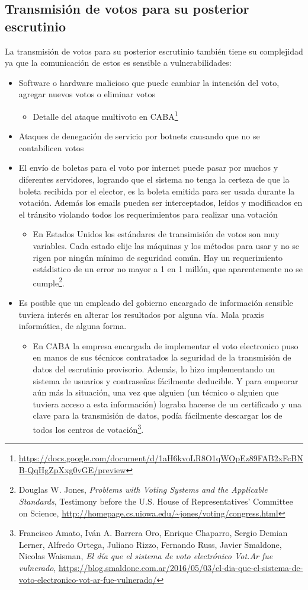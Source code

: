 \documentclass[a4,11pt]{article}
\begin{document}
\subsection{Transmisión de votos para su posterior escrutinio}

La transmisión de votos para su posterior escrutinio también tiene su complejidad ya que la comunicación de estos es sensible a vulnerabilidades:
\begin{itemize}
\item Software o hardware malicioso que puede cambiar la intención del voto, agregar nuevos votos o eliminar votos
\begin{itemize}
\item Detalle del ataque multivoto en CABA\footnote{\url{https://docs.google.com/document/d/1aH6kvoLR8O1qWOpEz89FAB2xFcBNB-QqHgZpXxg0vGE/preview}}
\end{itemize}
\item Ataques de denegación de servicio por botnets causando que no se contabilicen votos
\item El envío de boletas para el voto por internet puede pasar por muchos y diferentes servidores, logrando que el sistema no tenga la certeza de que la boleta recibida por el elector, es la boleta emitida para ser usada durante la votación. Además los emails pueden ser interceptados, leídos y modificados en el tránsito violando todos los requerimientos para realizar una votación
\begin{itemize}
\item En Estados Unidos los estándares de transimisión de votos son muy variables. Cada estado elije las máquinas y los métodos para usar y no se rigen por ningún mínimo de seguridad común. Hay un requerimiento estádistico de un error no mayor a 1 en 1 millón, que aparentemente no se cumple\footnote{Douglas W. Jones, \textit{Problems with Voting Systems and the Applicable Standards}, Testimony before the U.S. House of Representatives' Committee on Science, \url{http://homepage.cs.uiowa.edu/~jones/voting/congress.html}}.
\end{itemize}
\item Es posible que un empleado del gobierno encargado de información sensible tuviera interés en alterar los resultados por alguna vía. Mala praxis informática, de alguna forma.
\begin{itemize}
\item En CABA la empresa encargada de implementar el voto electronico  puso en manos de sus técnicos contratados la seguridad de la transmisión de datos del escrutinio provisorio. Además, lo hizo implementando un sistema de usuarios y contraseñas fácilmente deducible. Y para empeorar aún más la situación, una vez que alguien (un técnico o alguien que tuviera acceso a esta información) lograba hacerse de un certificado y una clave para la transmisión de datos, podía fácilmente descargar los de todos los centros de votación\footnote{Francisco Amato, Iván A. Barrera Oro, Enrique Chaparro, Sergio Demian Lerner, Alfredo Ortega, Juliano Rizzo, Fernando Russ, Javier Smaldone, Nicolas Waisman, \textit{El día que el sistema de voto electrónico Vot.Ar fue vulnerado}, \url{https://blog.smaldone.com.ar/2016/05/03/el-dia-que-el-sistema-de-voto-electronico-vot-ar-fue-vulnerado/}}.

\end{itemize}
\end{itemize}
\end{document}
